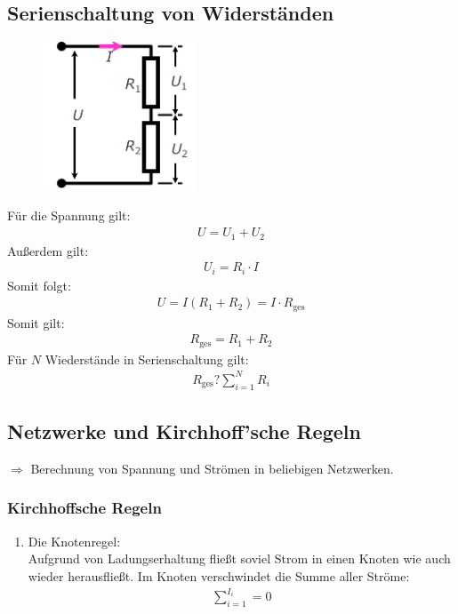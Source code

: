 \documentclass{article}
\begin{document}
\subsection{Serienschaltung von Widerständen}
\begin{figure}[H]
    \centering
    \includegraphics[width=0.4\textwidth]{serienschaltung.png}
\end{figure}
Für die Spannung gilt:
\begin{align}
    U=U_1+U_2
\end{align}
Außerdem gilt:
\begin{align}
    U_i=R_i\cdot I
\end{align}
Somit folgt:
\begin{align}
    U=I(R_1+R_2)=I\cdot R_\text{ges}
\end{align}
Somit gilt:
\begin{align}
    R_\text{ges}=R_1+R_2
\end{align}
Für $N$ Wiederstände in Serienschaltung gilt:
\begin{align}
    R_\text{ges}?\sum_{i=1}^{N}R_i
\end{align}

\subsection{Netzwerke und Kirchhoff'sche Regeln}
$\Rightarrow$ Berechnung von Spannung und Strömen in beliebigen Netzwerken.
\subsubsection{Kirchhoffsche Regeln}
\begin{enumerate}
    \item Die Knotenregel:\\
        Aufgrund von Ladungserhaltung fließt soviel Strom in einen Knoten wie auch wieder herausfließt.
        Im Knoten verschwindet die Summe aller Ströme:
        \begin{align}
            \sum_{i=1}^{I_i}=0
        \end{align}
\end{enumerate}
\end{document}
